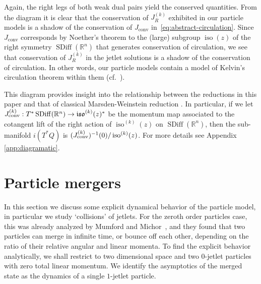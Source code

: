 \documentclass[12pt]{amsart}
\newcommand{\R}{\ensuremath{\mathbb{R}}}
\DeclareMathOperator{\SDiff}{SDiff}
\DeclareMathOperator{\iso}{iso}
\begin{document}
Again, the right legs of both weak dual pairs yield the conserved quantities.
From the diagram it is clear that the conservation of $J_R^{(k)}$ exhibited in
our particle models is a shadow of the conservation of $J_\text{conv}$ in~\eqref{eq:abstract-circulation}.
Since $J_\text{conv}$ corresponds by Noether's theorem to the (large)
subgroup $\iso(z)$ of the right symmetry $\SDiff(\R^n)$ that generates
conservation of circulation, we see that conservation of $J_R^{(k)}$ in the jetlet solutions is a shadow
of the conservation of circulation.
In other words, our particle models contain a model of Kelvin's circulation theorem within them (cf.~\cite[Theorem 5.5]{JacobsRatiuDesbrun2013}).

This diagram provides insight into the relationship between the reductions in this paper and that of classical Marsden-Weinstein reduction \cite{MarsdenWeinstein1974}.
In particular, if we let $J_{\rm conv}^{(k)}: T^*\SDiff(\R^n) \to \mathfrak{iso}^{(k)}(z)^*$ be the momentum map associated to the cotangent lift of the right action of $\iso^{(k)}(z)$ on $\SDiff(\R^n)$,
then the sub-manifold $i(T^*Q)$ is $(J_{\rm conv}^{(k)})^{-1}(0) / \iso^{(k)}(z)$.  For more details see Appendix \ref{app:diagramatic}.


\section{Particle mergers}
\label{sec:collisions}

In this section we discuss some explicit dynamical behavior of the
particle model, in particular we study `collisions' of jetlets. For
the zeroth order particles case, this was already analyzed by Mumford
and Michor~\cite{MumfordMichor2013}, and they found that two
particles can merge in infinite time, or bounce off each other,
depending on the ratio of their relative angular and linear momenta.
To find the explicit behavior analytically, we shall restrict to two
dimensional space and two $0$-jetlet particles with zero total linear
momentum. We identify the asymptotics of the merged state as the
dynamics of a single $1$-jetlet particle.
\end{document}
